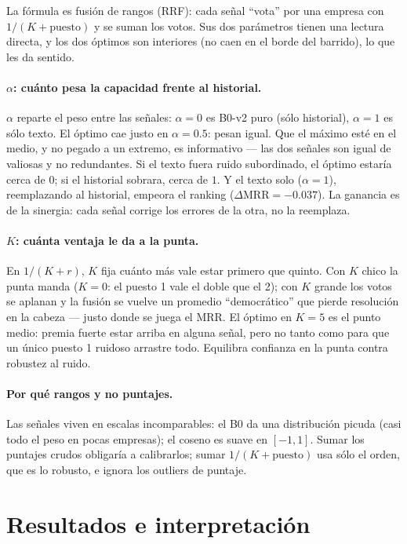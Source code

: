 \documentclass[11pt]{article}
\begin{document}
La fórmula es fusión de rangos (RRF): cada señal ``vota'' por una empresa con $1/(K+\text{puesto})$ y
se suman los votos. Sus dos parámetros tienen una lectura directa, y los dos óptimos son interiores
(no caen en el borde del barrido), lo que les da sentido.

\paragraph{$\alpha$: cuánto pesa la capacidad frente al historial.} $\alpha$ reparte el peso entre
las señales: $\alpha{=}0$ es B0-v2 puro (sólo historial), $\alpha{=}1$ es sólo texto. El óptimo cae
justo en $\alpha{=}0.5$: pesan igual. Que el máximo esté en el medio, y no pegado a un extremo, es
informativo --- las dos señales son igual de valiosas y no redundantes. Si el texto fuera ruido
subordinado, el óptimo estaría cerca de $0$; si el historial sobrara, cerca de $1$. Y el texto solo
($\alpha{=}1$), reemplazando al historial, empeora el ranking ($\Delta\text{MRR}=-0.037$). La
ganancia es de la sinergia: cada señal corrige los errores de la otra, no la reemplaza.

\paragraph{$K$: cuánta ventaja le da a la punta.} En $1/(K+r)$, $K$ fija cuánto más vale estar
primero que quinto. Con $K$ chico la punta manda ($K{=}0$: el puesto 1 vale el doble que el 2); con
$K$ grande los votos se aplanan y la fusión se vuelve un promedio ``democrático'' que pierde
resolución en la cabeza --- justo donde se juega el MRR. El óptimo en $K{=}5$ es el punto medio:
premia fuerte estar arriba en alguna señal, pero no tanto como para que un único puesto 1 ruidoso
arrastre todo. Equilibra confianza en la punta contra robustez al ruido.

\paragraph{Por qué rangos y no puntajes.} Las señales viven en escalas incomparables: el B0 da una
distribución picuda (casi todo el peso en pocas empresas); el coseno es suave en $[-1,1]$. Sumar los
puntajes crudos obligaría a calibrarlos; sumar $1/(K+\text{puesto})$ usa sólo el orden, que es lo
robusto, e ignora los outliers de puntaje.

\section{Resultados e interpretación}
\end{document}
